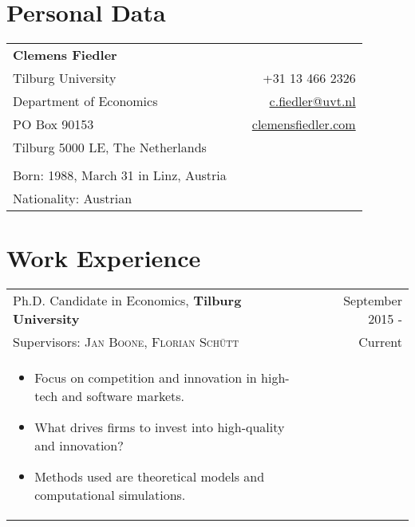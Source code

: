 \documentclass[a4paper,10pt]{article} %
\begin{document}
\pagestyle{fancy}
\fancyhf{}
\lfoot{\today}
\renewcommand{\footrulewidth}{1pt}



\par{\bigskip\par} %

\section{Personal Data}

\begin{tabular}{lp{1.5cm}r}
	\textbf{Clemens Fiedler}& & \\
Tilburg University 					& &+31 13 466 2326\\
Department of Economics				& &\href{c.fiedler@tilburguniversity.edu}{c.fiedler@uvt.nl}\\
PO Box 90153						& &\href{https://clemensfiedler.com/}{clemensfiedler.com}\\
Tilburg 5000 LE, The Netherlands	& & \\
& & \\
Born: 1988, March 31 in Linz, Austria & & \\
Nationality: Austrian & &
\end{tabular}\vspace{1cm}

\par


\section{Work Experience}

\begin{tabular}{p{12cm} r}
	Ph.D. Candidate in Economics, \textbf{Tilburg University} &September 2015 -\\
	\small Supervisors:  \textsc{Jan Boone},  \textsc{Florian Schütt} & Current\phantom{ -}\\
	\begin{itemize}[noitemsep]
		\item Focus on competition and innovation in high-tech and software markets.
		\item What drives firms to invest into high-quality and innovation?
		\item Methods used are theoretical models and computational simulations.
	\end{itemize}&\\
\end{tabular}\vspace{1cm}
\end{document}
